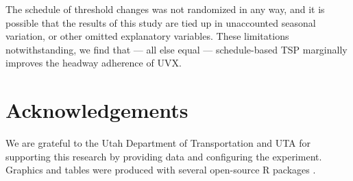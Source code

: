 \documentclass[3p, authoryear, review]{elsarticle} %
\begin{document}
The schedule of threshold changes was not randomized in any way,
and it is possible that the results of this study are tied up in unaccounted
seasonal variation, or other omitted explanatory variables. These limitations
notwithstanding, we find that --- all else equal --- schedule-based TSP
marginally improves the headway adherence of UVX.

\hypertarget{acknowledgements}{%
\section{Acknowledgements}\label{acknowledgements}}

We are grateful to the Utah Department of Transportation and UTA for supporting
this research by providing data and configuring the experiment. Graphics and
tables were produced with several open-source R packages \citep{ggmap, modelsummary, wesanderson}.


\end{document}
